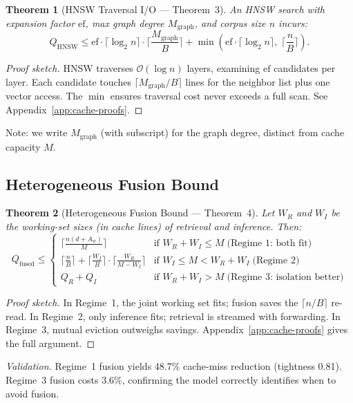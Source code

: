 \documentclass{article}
\newtheorem{theorem}{Theorem}
\theoremstyle{definition}
\theoremstyle{remark}
\newcommand{\BigO}{\mathcal{O}}
\newcommand{\ceil}[1]{\lceil #1 \rceil}
\newcommand{\Qfused}{Q_{\mathrm{fused}}}
\newcommand{\Qhnsw}{Q_{\mathrm{HNSW}}}
\newcommand{\Mgraph}{M_{\mathrm{graph}}}
\begin{document}
\begin{theorem}[HNSW Traversal I/O --- Theorem~3]\label{thm:hnsw}
An HNSW search with expansion factor $\mathrm{ef}$, max graph degree $\Mgraph$, and corpus size $n$ incurs:
\[
  \Qhnsw \leq \mathrm{ef} \cdot \ceil{\log_2 n} \cdot \ceil{\frac{\Mgraph}{B}} + \min\!\left(\mathrm{ef} \cdot \ceil{\log_2 n},\; \ceil{\frac{n}{B}}\right).
\]
\end{theorem}

\begin{proof}[Proof sketch]
HNSW traverses $\BigO(\log n)$ layers, examining $\mathrm{ef}$ candidates per layer. Each candidate touches $\ceil{\Mgraph/B}$ lines for the neighbor list plus one vector access. The $\min$ ensures traversal cost never exceeds a full scan. See Appendix~\ref{app:cache-proofs}.
\end{proof}

Note: we write $\Mgraph$ (with subscript) for the graph degree, distinct from cache capacity $M$.

\subsection{Heterogeneous Fusion Bound}

\begin{theorem}[Heterogeneous Fusion Bound --- Theorem~4]\label{thm:hetero}
Let $W_R$ and $W_I$ be the working-set sizes (in cache lines) of retrieval and inference. Then:
\[
  \Qfused \leq
  \begin{cases}
    \ceil{\frac{n(d+A_w)}{M}} & \text{if } W_R + W_I \leq M \;\text{(Regime 1: both fit)} \\[4pt]
    \ceil{\frac{n}{B}} + \ceil{\frac{W_I}{B}} \cdot \ceil{\frac{W_R}{M - W_I}} & \text{if } W_I \leq M < W_R + W_I \;\text{(Regime 2)} \\[4pt]
    Q_R + Q_I & \text{if } W_R + W_I > M \;\text{(Regime 3: isolation better)}
  \end{cases}
\]
\end{theorem}

\begin{proof}[Proof sketch]
In Regime~1, the joint working set fits; fusion saves the $\ceil{n/B}$ re-read. In Regime~2, only inference fits; retrieval is streamed with forwarding. In Regime~3, mutual eviction outweighs savings. Appendix~\ref{app:cache-proofs} gives the full argument.
\end{proof}

\emph{Validation.}
Regime~1 fusion yields 48.7\% cache-miss reduction (tightness 0.81).
Regime~3 fusion costs 3.6\%, confirming the model correctly identifies when to avoid fusion.
\end{document}
